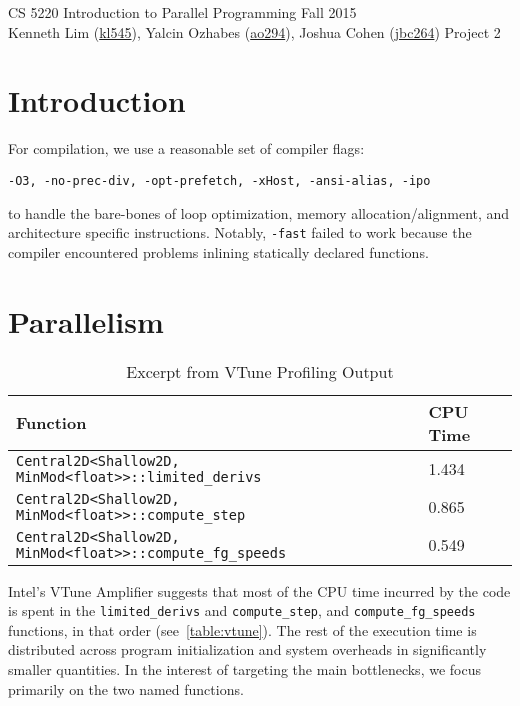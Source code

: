 \documentclass{scrartcl}
\begin{document}
  \begin{framed}
  CS 5220 Introduction to Parallel Programming \hfill Fall 2015 \\
  Kenneth Lim (\href{mailto:kl545@cornell.edu}{kl545}), Yalcin Ozhabes (\href{mailto:ao294@cornell.edu}{ao294}), Joshua Cohen (\href{mailto:jbc264@cornell.edu}{jbc264}) \hfill Project 2 \hspace{-3ex}
  \end{framed}
    \section{Introduction}
    For compilation, we use a reasonable set of compiler flags:
    \begin{verbatim}-O3, -no-prec-div, -opt-prefetch, -xHost, -ansi-alias, -ipo\end{verbatim}
    to handle the bare-bones of loop optimization, memory allocation/alignment, and architecture specific instructions. Notably, \verb|-fast| failed to work because the compiler encountered problems inlining statically declared functions.
    \section{Parallelism}
    \begin{table}[ht!]
      \centering
      \begin{tabu}{ll}
        \toprule
        Function & CPU Time \\
        \midrule
        \texttt{Central2D<Shallow2D, MinMod<float>>::limited\_derivs}   & 1.434 \\
        \texttt{Central2D<Shallow2D, MinMod<float>>::compute\_step}      & 0.865 \\
        \texttt{Central2D<Shallow2D, MinMod<float>>::compute\_fg\_speeds} & 0.549 \\
        \bottomrule
      \end{tabu}
      \caption{Excerpt from VTune Profiling Output\label{table:vtune}}
    \end{table}
    Intel's VTune Amplifier suggests that most of the CPU time incurred by the code is spent in the \verb|limited_derivs| and \verb|compute_step|, and \verb|compute_fg_speeds| functions, in that order (see~\autoref{table:vtune}). The rest of the execution time is distributed across program initialization and system overheads in significantly smaller quantities. In the interest of targeting the main bottlenecks, we focus primarily on the two named functions.
\end{document}
